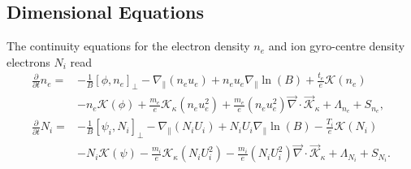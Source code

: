 \subsection{Dimensional Equations}
The continuity equations for the electron density \(n_e\) and  ion gyro-centre density electrons  \(N_i\) read
\begin{align}
 \frac{\partial}{\partial t}n_e =&
 - \frac{1}{B}\left[\phi,  n_e \right]_{\perp}
 -  {\nabla}_{\parallel}( n_e u_e)
 + n_e u_e   {\nabla}_{\parallel} \ln{(B)}
+ \frac{t_e }{e }  \mathcal{K} \left( n_e\right)
\nonumber  \\ &
-   n_e \mathcal{K}(\phi)
   +  \frac{m_e }{ e } \mathcal{K}_{\kappa} \left( n_e u_e^2 \right)
   + \frac{m_e }{ e } \left( n_e u_e^2 \right) \vec{\nabla} \cdot  \vec{\mathcal{K}}_{\kappa}
   + \Lambda_{n_e} + S_{n_e},\\
\frac{\partial}{\partial t}N_i =&
 - \frac{1}{B}\left[\psi_i,  N_i \right]_{\perp}
 - {\nabla}_{\parallel}(N_i U_i)
 + N_i U_i   {\nabla}_{\parallel} \ln{(B)}
- \frac{T_i }{e }  \mathcal{K} \left( N_i\right)
\nonumber  \\ &
-   N_i \mathcal{K}(\psi)
- \frac{m_i }{ e }\mathcal{K}_{\kappa}  \left( N_i U_i^2 \right)
- \frac{m_i }{ e } \left( N_i U_i^2 \right)\vec{\nabla} \cdot  \vec{\mathcal{K}}_{\kappa}
+ \Lambda_{N_i} + S_{N_i}.
\end{align}
